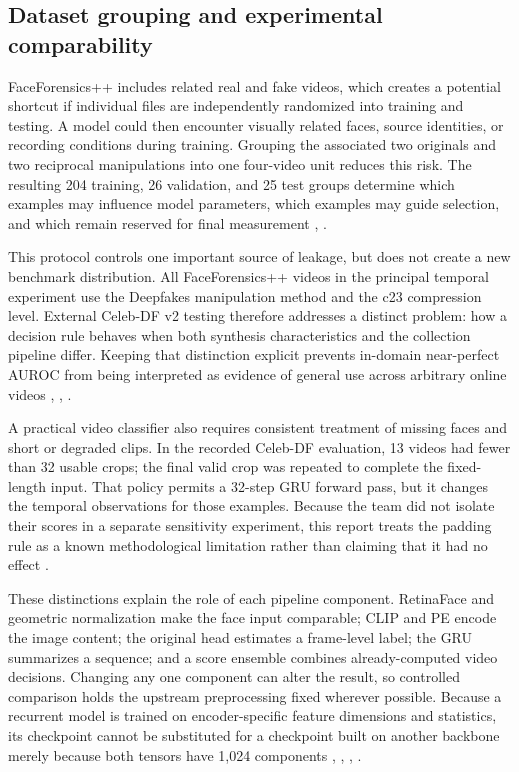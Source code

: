 \documentclass[conference,10pt]{IEEEtran}
\begin{document}
\subsection{Dataset grouping and experimental comparability}
FaceForensics++ includes related real and fake videos, which creates a potential shortcut if individual files are independently randomized into training and testing. A model could then encounter visually related faces, source identities, or recording conditions during training. Grouping the associated two originals and two reciprocal manipulations into one four-video unit reduces this risk. The resulting 204 training, 26 validation, and 25 test groups determine which examples may influence model parameters, which examples may guide selection, and which remain reserved for final measurement \cite{rossler2019}, \cite{capstone2026}.

This protocol controls one important source of leakage, but does not create a new benchmark distribution. All FaceForensics++ videos in the principal temporal experiment use the Deepfakes manipulation method and the c23 compression level. External Celeb-DF v2 testing therefore addresses a distinct problem: how a decision rule behaves when both synthesis characteristics and the collection pipeline differ. Keeping that distinction explicit prevents in-domain near-perfect AUROC from being interpreted as evidence of general use across arbitrary online videos \cite{rossler2019}, \cite{li2020}, \cite{capstone2026}.

A practical video classifier also requires consistent treatment of missing faces and short or degraded clips. In the recorded Celeb-DF evaluation, 13 videos had fewer than 32 usable crops; the final valid crop was repeated to complete the fixed-length input. That policy permits a 32-step GRU forward pass, but it changes the temporal observations for those examples. Because the team did not isolate their scores in a separate sensitivity experiment, this report treats the padding rule as a known methodological limitation rather than claiming that it had no effect \cite{capstone2026}.

These distinctions explain the role of each pipeline component. RetinaFace and geometric normalization make the face input comparable; CLIP and PE encode the image content; the original head estimates a frame-level label; the GRU summarizes a sequence; and a score ensemble combines already-computed video decisions. Changing any one component can alter the result, so controlled comparison holds the upstream preprocessing fixed wherever possible. Because a recurrent model is trained on encoder-specific feature dimensions and statistics, its checkpoint cannot be substituted for a checkpoint built on another backbone merely because both tensors have 1,024 components \cite{yermakov2026}, \cite{deng2020}, \cite{cho2014}, \cite{capstone2026}.
\end{document}
